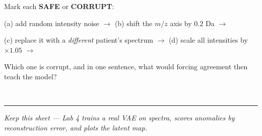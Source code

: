 \documentclass[11pt]{article}
\newif\ifsolution
\newcommand{\blk}[1]{\underline{\hspace{#1}}}
\newcommand{\rb}[2]{\ifsolution\textbf{#1}\else\blk{#2}\fi}
\newcommand{\keybox}[1]{\ifsolution\par\vspace{2pt}%
  \fbox{\parbox{0.965\textwidth}{\small\textbf{Answer.}\; #1}}\par\fi}
\newcommand{\work}[1]{\ifsolution\else\vspace{#1}\fi}
\begin{document}
\vspace{3pt}
Mark each \textbf{SAFE} or \textbf{CORRUPT}:

\vspace{2pt}
(a) add random intensity noise $\rightarrow$ \rb{SAFE}{2.6cm} \qquad
(b) shift the $m/z$ axis by $0.2$ Da $\rightarrow$ \rb{SAFE}{2.6cm}

\vspace{2pt}
(c) replace it with a \emph{different} patient's spectrum $\rightarrow$ \rb{\textbf{CORRUPT}}{2.6cm} \qquad
(d) scale all intensities by $\times 1.05$ $\rightarrow$ \rb{SAFE}{2.6cm}

\vspace{3pt}
Which one is corrupt, and in one sentence, what would forcing agreement then teach the model?

\work{1.0cm}
\ifsolution\else\blk{\linewidth}\\[6pt]\blk{\linewidth}\fi

\keybox{\textbf{(c) is corrupt}; (a), (b) and (d) are safe. A valid augmentation adds only the
\emph{nuisance} variation the SAME sample would show run-to-run --- detector noise, a small $m/z$
calibration drift, a global intensity rescale --- so forcing those views to agree makes the model
\textbf{ignore the nuisance and keep the real content} (augmentation-invariance). But (c) is a
\emph{genuinely different sample}: forcing its embedding to match would teach the model to
\textbf{ignore real biological differences} --- it would treat two different patients as identical.
Rule: augmentations must preserve the underlying biology.}

\vspace{4pt}\hrule\vspace{3pt}
{\small\itshape \ifsolution Answer key.\else Keep this sheet --- Lab 4 trains a real VAE on
spectra, scores anomalies by reconstruction error, and plots the latent map.\fi}
\end{document}
